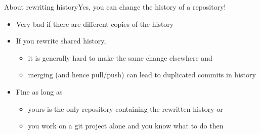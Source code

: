 \documentclass[usenames,svgnames,14pt]{beamer}
\begin{document}
\begin{frame}{About rewriting history}{Yes, you can change the history of a repository!}
\begin{overlayarea}{\textwidth}{0.3\textheight}
    \begin{itemize}
        \item\alert{Very bad if there are different copies of the history} 
        \item If you rewrite shared history,\\
              \begin{itemize}
                  \item it is generally hard to make the same change elsewhere and\\
                  \item merging (and hence pull/push) can lead to duplicated commits in history
              \end{itemize}
        \item<only@1> Fine as long as\\
              \begin{itemize}
                  \item yours is the only repository containing the rewritten history or
                  \item you work on a git project alone and you know what to do then
              \end{itemize}
    \end{itemize}
\end{overlayarea}
    \begin{center}
\end{center}
\end{frame}
\end{document}
